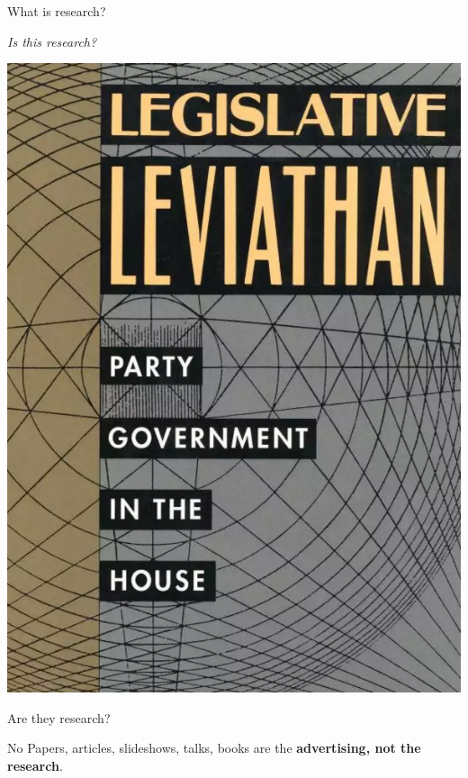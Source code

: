 \documentclass[10pt]{beamer}
\begin{document}
\begin{frame}{What is research?}

    \begin{center}
        {\large{\emph{Is this research?}}}

        \vspace{0.5cm}

        \includegraphics[scale=0.2]{img/cox.png}
    \end{center}
\end{frame}

\begin{frame}{Are they research?}

    \begin{alertblock}{No}
        Papers, articles, slideshows, talks, books are the {\large{\textbf{advertising, not the research}}}.
    \end{alertblock}

\end{frame}
\end{document}
